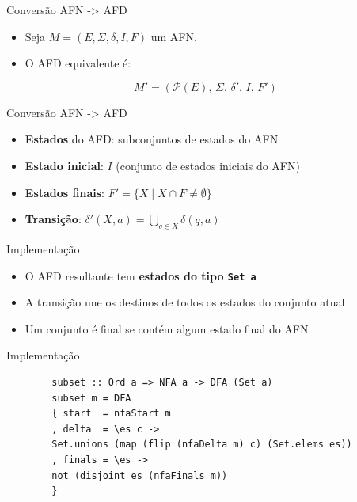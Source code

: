 \begin{frame}{Conversão AFN -\textgreater{} AFD}

    \begin{itemize}

        \item
        Seja \(M = (E, \Sigma, \delta, I, F)\) um AFN.
        \item
        O AFD equivalente é:
    \end{itemize}

    \[M' = (\mathcal{P}(E),\, \Sigma,\, \delta',\, I,\, F')\]
\end{frame}

\begin{frame}{Conversão AFN -\textgreater{} AFD}

    \begin{itemize}

        \item
        \textbf{Estados} do AFD: subconjuntos de estados do AFN
        \item
        \textbf{Estado inicial}: \(I\) (conjunto de estados iniciais do AFN)
        \item
        \textbf{Estados finais}: \(F' = \{X \mid X \cap F \neq \emptyset\}\)
        \item
        \textbf{Transição}: \(\delta'(X, a) = \bigcup_{q \in X} \delta(q, a)\)
    \end{itemize}
\end{frame}

\begin{frame}[fragile]{Implementação}

    \begin{itemize}

        \item
        O AFD resultante tem \textbf{estados do tipo
        \texttt{Set a}}
        \item
        A transição une os destinos de todos os estados do conjunto atual
        \item
        Um conjunto é final se contém algum estado final do AFN
    \end{itemize}
\end{frame}

\begin{frame}[fragile]{Implementação}

    \begin{lstlisting}
        subset :: Ord a => NFA a -> DFA (Set a)
        subset m = DFA
        { start  = nfaStart m
        , delta  = \es c ->
        Set.unions (map (flip (nfaDelta m) c) (Set.elems es))
        , finals = \es ->
        not (disjoint es (nfaFinals m))
        }
    \end{lstlisting}
\end{frame}


